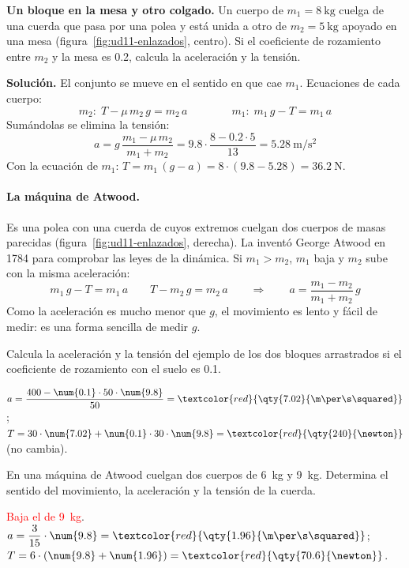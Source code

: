 \begin{example}
    \textbf{Un bloque en la mesa y otro colgado.} Un cuerpo de \(m_1 = \qty{8}{\kg}\) cuelga de una cuerda que pasa por una polea y
    está unida a otro de \(m_2 = \qty{5}{\kg}\) apoyado en una mesa (figura~\ref{fig:ud11-enlazados}, centro). Si el coeficiente de
    rozamiento entre \(m_2\) y la mesa es \num{0.2}, calcula la aceleración y la tensión.

    \textbf{Solución.} El conjunto se mueve en el sentido en que cae \(m_1\). Ecuaciones de cada cuerpo:
    \[ m_2:\; T - \mu\,m_2\,g = m_2\,a \qquad\qquad m_1:\; m_1\,g - T = m_1\,a \]
    Sumándolas se elimina la tensión:
    \[ a = g\,\frac{m_1 - \mu\,m_2}{m_1 + m_2} = \num{9.8} \cdot \frac{8 - \num{0.2} \cdot 5}{13} = \qty{5.28}{\m\per\s\squared} \]
    Con la ecuación de \(m_1\): \(T = m_1\,(g - a) = 8 \cdot (\num{9.8} - \num{5.28}) = \qty{36.2}{\newton}\).
\end{example}

\paragraph{La máquina de Atwood.} Es una polea con una cuerda de cuyos extremos cuelgan dos cuerpos de masas parecidas
(figura~\ref{fig:ud11-enlazados}, derecha). La inventó George Atwood en 1784 para comprobar las leyes de la dinámica. Si \(m_1 > m_2\),
\(m_1\) baja y \(m_2\) sube con la misma aceleración:
\[ m_1\,g - T = m_1\,a \qquad T - m_2\,g = m_2\,a \qquad\Longrightarrow\qquad a = \frac{m_1 - m_2}{m_1 + m_2}\,g \]
Como la aceleración es mucho menor que \(g\), el movimiento es lento y fácil de medir: es una forma sencilla de medir \(g\).

\begin{exercise}
    Calcula la aceleración y la tensión del ejemplo de los dos bloques arrastrados si el coeficiente de rozamiento con el suelo es
    \num{0.1}.
    \begin{solu}
        \(a = \dfrac{400 - \num{0.1} \cdot 50 \cdot \num{9.8}}{50} = \textcolor{red}{\qty{7.02}{\m\per\s\squared}}\);
        \(T = 30 \cdot \num{7.02} + \num{0.1} \cdot 30 \cdot \num{9.8} = \textcolor{red}{\qty{240}{\newton}}\) (no cambia).
    \end{solu}
\end{exercise}

\begin{exercise}
    En una máquina de Atwood cuelgan dos cuerpos de \qty{6}{\kg} y \qty{9}{\kg}. Determina el sentido del movimiento, la aceleración y
    la tensión de la cuerda.
    \begin{solu}
        \textcolor{red}{Baja el de \qty{9}{\kg}}. \(a = \dfrac{3}{15} \cdot \num{9.8} = \textcolor{red}{\qty{1.96}{\m\per\s\squared}}\);
        \(T = 6 \cdot (\num{9.8} + \num{1.96}) = \textcolor{red}{\qty{70.6}{\newton}}\).
    \end{solu}
\end{exercise}

